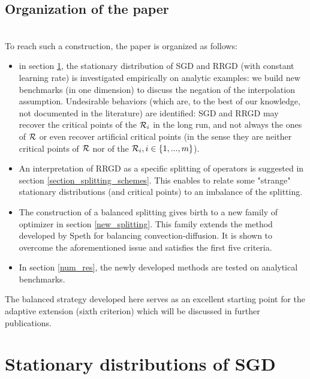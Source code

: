 \documentclass[article,authoryear,jmlmc]{beg_32}             %
\begin{document}
\subsection{Organization of the paper}
~~\\
To reach such a construction, the paper is organized as follows:
\begin{itemize}
	\item in section \ref{section_stationary}, the stationary distribution of SGD and RRGD (with constant learning rate) is investigated empirically on analytic examples: we build new benchmarks (in one
          dimension) to discuss the negation of the interpolation assumption. Undesirable behaviors (which are, to the best of our knowledge, not documented in the literature) are
          identified: SGD and RRGD may recover the critical points of the $\mathcal{R}_i$ in the long run, and not always the ones of $\mathcal{R}$ or even recover artificial critical points (in the
          sense they are neither critical points of $\mathcal{R}$ nor of the $\mathcal{R}_i, i\in\{1,...,m\}$). 
        \item An interpretation of RRGD as a specific splitting of operators is suggested in section \ref{section_splitting_schemes}. This enables to relate some "strange"
          stationary distributions (and critical points) to an imbalance of the splitting. 
	\item The construction of a balanced splitting gives birth to a new family of optimizer in section \ref{new_splitting}. This family extends the method developed by Speth \cite{rebalanced_splitting} for balancing convection-diffusion. It is shown to overcome the aforementioned issue and satisfies the first five criteria.
	\item In section \ref{num_res}, the newly developed methods are tested on analytical benchmarks. 
\end{itemize}
The balanced strategy developed here serves as an excellent starting point for the adaptive extension (sixth criterion) which will be discussed in further publications. 

\section{Stationary distributions of SGD}
\label{section_stationary}
\end{document}
